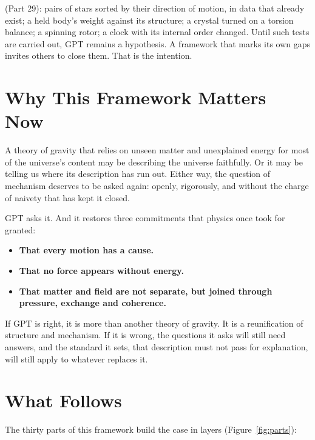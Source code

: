  (Part 29): pairs of stars sorted by their direction of motion, in data that already exist; a held body's weight against its structure; a crystal turned on a torsion balance; a spinning rotor; a clock with its internal order changed. Until such tests are carried out, GPT remains a hypothesis. A framework that marks its own gaps invites others to close them. That is the intention.

\section{Why This Framework Matters Now}

A theory of gravity that relies on unseen matter and unexplained energy for most of the universe's content may be describing the universe faithfully. Or it may be telling us where its description has run out. Either way, the question of mechanism deserves to be asked again: openly, rigorously, and without the charge of naivety that has kept it closed.

GPT asks it. And it restores three commitments that physics once took for granted:

\begin{itemize}
  \item \textbf{That every motion has a cause.}
  \item \textbf{That no force appears without energy.}
  \item \textbf{That matter and field are not separate, but joined through pressure, exchange and coherence.}
\end{itemize}

If GPT is right, it is more than another theory of gravity. It is a reunification of structure and mechanism. If it is wrong, the questions it asks will still need answers, and the standard it sets, that description must not pass for explanation, will still apply to whatever replaces it.

\section{What Follows}

The thirty parts of this framework build the case in layers (Figure~\ref{fig:parts}):

